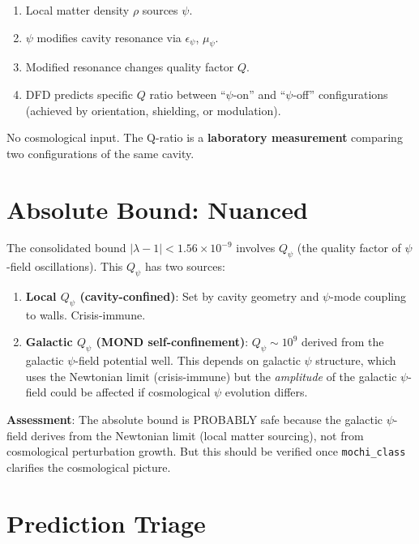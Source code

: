 \documentclass[11pt]{article}
\begin{document}
\begin{enumerate}
\item Local matter density $\rho$ sources $\psi$.
\item $\psi$ modifies cavity resonance via $\epsilon_\psi$, $\mu_\psi$.
\item Modified resonance changes quality factor $Q$.
\item DFD predicts specific $Q$ ratio between ``$\psi$-on'' and
  ``$\psi$-off'' configurations (achieved by orientation, shielding,
  or modulation).
\end{enumerate}

No cosmological input. The Q-ratio is a \textbf{laboratory measurement}
comparing two configurations of the same cavity.

\section{Absolute Bound: Nuanced}

The consolidated bound $|\lambda-1| < 1.56 \times 10^{-9}$ involves
$Q_\psi$ (the quality factor of $\psi$-field oscillations). This $Q_\psi$
has two sources:

\begin{enumerate}
\item \textbf{Local $Q_\psi$ (cavity-confined)}: Set by cavity geometry
  and $\psi$-mode coupling to walls. Crisis-immune.
\item \textbf{Galactic $Q_\psi$ (MOND self-confinement)}: $Q_\psi \sim
  10^9$ derived from the galactic $\psi$-field potential well. This
  depends on galactic $\psi$ structure, which uses the Newtonian limit
  (crisis-immune) but the \emph{amplitude} of the galactic $\psi$-field
  could be affected if cosmological $\psi$ evolution differs.
\end{enumerate}

\textbf{Assessment}: The absolute bound is PROBABLY safe because the
galactic $\psi$-field derives from the Newtonian limit (local matter
sourcing), not from cosmological perturbation growth. But this should
be verified once \texttt{mochi\_class} clarifies the cosmological picture.

\section{Prediction Triage}
\end{document}
